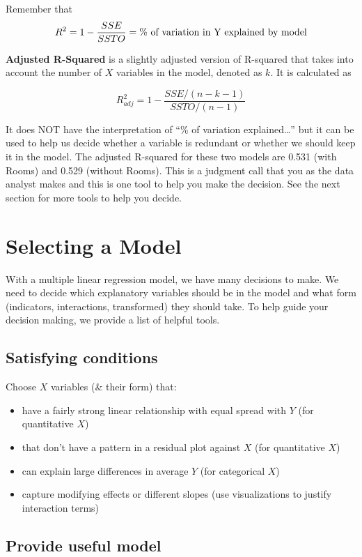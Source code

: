 \documentclass[
]{book}
\providecommand{\tightlist}{%
  \setlength{\itemsep}{0pt}\setlength{\parskip}{0pt}}
\begin{document}
Remember that
\[R^2 = 1 - \frac{SSE}{SSTO} = \%\hbox{ of variation in Y explained by model}\]

\textbf{Adjusted R-Squared} is a slightly adjusted version of R-squared that takes into account the number of \(X\) variables in the model, denoted as \(k\). It is calculated as

\[R^2_{adj} = 1 - \frac{SSE/(n-k-1)}{SSTO/(n-1)}\]

It does NOT have the interpretation of ``\% of variation explained\ldots{}'' but it can be used to help us decide whether a variable is redundant or whether we should keep it in the model. The adjusted R-squared for these two models are 0.531 (with Rooms) and 0.529 (without Rooms). This is a judgment call that you as the data analyst makes and this is one tool to help you make the decision. See the next section for more tools to help you decide.

\section{Selecting a Model}\label{selecting-a-model}

With a multiple linear regression model, we have many decisions to make. We need to decide which explanatory variables should be in the model and what form (indicators, interactions, transformed) they should take. To help guide your decision making, we provide a list of helpful tools.

\subsection{Satisfying conditions}\label{satisfying-conditions}

Choose \(X\) variables (\& their form) that:

\begin{itemize}
\tightlist
\item
  have a fairly strong linear relationship with equal spread with \(Y\) (for quantitative \(X\))
\item
  that don't have a pattern in a residual plot against \(X\) (for quantitative \(X\))
\item
  can explain large differences in average \(Y\) (for categorical \(X\))
\item
  capture modifying effects or different slopes (use visualizations to justify interaction terms)
\end{itemize}

\subsection{Provide useful model}\label{provide-useful-model}
\end{document}
